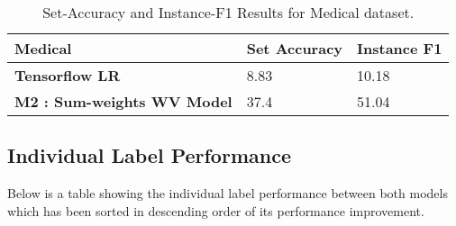 \begin{table}[htbp]
\begin{tabular}{l|l|l}
Medical                & \multicolumn{1}{c|}{\textbf{Set Accuracy}} & \multicolumn{1}{c}{\textbf{Instance F1}} \\ \hline
\textbf{Tensorflow LR} & 8.83                                       & 10.18                                    \\
\textbf{M2 : Sum-weights WV Model}     & 37.4                                       & 51.04                                   
\end{tabular}
\caption{\label{tab:widgets}Set-Accuracy and Instance-F1 Results for Medical dataset.}
\end{table}

\subsection{Individual Label Performance}

Below is a table showing the individual label performance between both models which has been sorted in descending order of its performance improvement.

